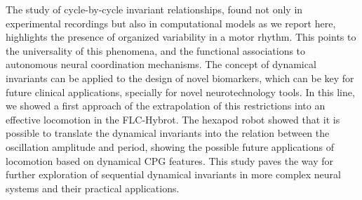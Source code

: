 The study of cycle-by-cycle invariant relationships, found not only in experimental recordings but also in computational models as we report here, highlights the presence of organized variability in a motor rhythm. This points to the universality of this phenomena, and the functional associations to autonomous neural coordination mechanisms. The concept of dynamical invariants can be applied to the design of novel biomarkers, which can be key for future clinical applications, specially for novel neurotechnology tools. In this line, we showed a first approach of the extrapolation of this restrictions into an effective locomotion in the FLC-Hybrot. The hexapod robot  showed that it is possible to translate the dynamical invariants into the relation between the oscillation amplitude and period, showing the possible future applications of locomotion based on dynamical CPG features. This study paves the way for further exploration of sequential dynamical invariants in more complex neural systems and their practical applications.










